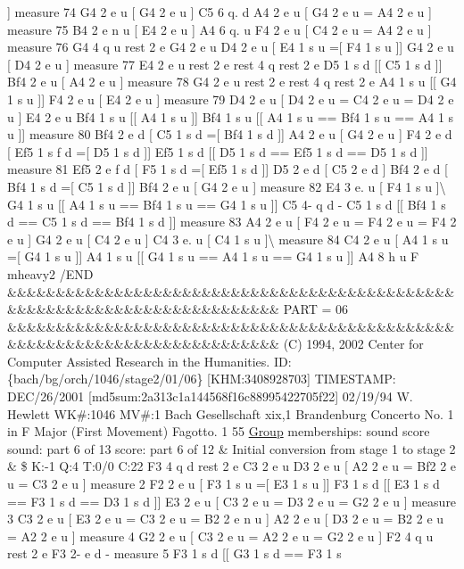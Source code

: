 \mbox{]} measure 74 G4 2 e u \mbox{[} G4 2 e u \mbox{]} C5 6 q. d A4 2 e u \mbox{[} G4 2 e u = A4 2 e u \mbox{]} measure 75 B4 2 e n u \mbox{[} E4 2 e u \mbox{]} A4 6 q. u F4 2 e u \mbox{[} C4 2 e u = A4 2 e u \mbox{]} measure 76 G4 4 q u rest 2 e G4 2 e u D4 2 e u \mbox{[} E4 1 s u =\mbox{[} F4 1 s u \mbox{]}\mbox{]} G4 2 e u \mbox{[} D4 2 e u \mbox{]} measure 77 E4 2 e u rest 2 e rest 4 q rest 2 e D5 1 s d \mbox{[}\mbox{[} C5 1 s d \mbox{]}\mbox{]} Bf4 2 e u \mbox{[} A4 2 e u \mbox{]} measure 78 G4 2 e u rest 2 e rest 4 q rest 2 e A4 1 s u \mbox{[}\mbox{[} G4 1 s u \mbox{]}\mbox{]} F4 2 e u \mbox{[} E4 2 e u \mbox{]} measure 79 D4 2 e u \mbox{[} D4 2 e u = C4 2 e u = D4 2 e u \mbox{]} E4 2 e u Bf4 1 s u \mbox{[}\mbox{[} A4 1 s u \mbox{]}\mbox{]} Bf4 1 s u \mbox{[}\mbox{[} A4 1 s u == Bf4 1 s u == A4 1 s u \mbox{]}\mbox{]} measure 80 Bf4 2 e d \mbox{[} C5 1 s d =\mbox{[} Bf4 1 s d \mbox{]}\mbox{]} A4 2 e u \mbox{[} G4 2 e u \mbox{]} F4 2 e d \mbox{[} Ef5 1 s f d =\mbox{[} D5 1 s d \mbox{]}\mbox{]} Ef5 1 s d \mbox{[}\mbox{[} D5 1 s d == Ef5 1 s d == D5 1 s d \mbox{]}\mbox{]} measure 81 Ef5 2 e f d \mbox{[} F5 1 s d =\mbox{[} Ef5 1 s d \mbox{]}\mbox{]} D5 2 e d \mbox{[} C5 2 e d \mbox{]} Bf4 2 e d \mbox{[} Bf4 1 s d =\mbox{[} C5 1 s d \mbox{]}\mbox{]} Bf4 2 e u \mbox{[} G4 2 e u \mbox{]} measure 82 E4 3 e. u \mbox{[} F4 1 s u \mbox{]}\textbackslash{} G4 1 s u \mbox{[}\mbox{[} A4 1 s u == Bf4 1 s u == G4 1 s u \mbox{]}\mbox{]} C5 4-\/ q d -\/ C5 1 s d \mbox{[}\mbox{[} Bf4 1 s d == C5 1 s d == Bf4 1 s d \mbox{]}\mbox{]} measure 83 A4 2 e u \mbox{[} F4 2 e u = F4 2 e u = F4 2 e u \mbox{]} G4 2 e u \mbox{[} C4 2 e u \mbox{]} C4 3 e. u \mbox{[} C4 1 s u \mbox{]}\textbackslash{} measure 84 C4 2 e u \mbox{[} A4 1 s u =\mbox{[} G4 1 s u \mbox{]}\mbox{]} A4 1 s u \mbox{[}\mbox{[} G4 1 s u == A4 1 s u == G4 1 s u \mbox{]}\mbox{]} A4 8 h u F mheavy2 /\+E\+ND \&\&\&\&\&\&\&\&\&\&\&\&\&\&\&\&\&\&\&\&\&\&\&\&\&\&\&\&\&\&\&\&\&\&\&\&\&\&\&\&\&\&\&\&\&\&\&\&\&\&\&\&\&\&\&\&\&\&\&\&\&\&\&\&\&\&\&\&\&\&\&\&\&\& P\+A\+RT = 06 \&\&\&\&\&\&\&\&\&\&\&\&\&\&\&\&\&\&\&\&\&\&\&\&\&\&\&\&\&\&\&\&\&\&\&\&\&\&\&\&\&\&\&\&\&\&\&\&\&\&\&\&\&\&\&\&\&\&\&\&\&\&\&\&\&\&\&\&\&\&\&\&\&\& (C) 1994, 2002 Center for Computer Assisted Research in the Humanities. ID\+: \{bach/bg/orch/1046/stage2/01/06\} \mbox{[}K\+HM\+:3408928703\mbox{]} T\+I\+M\+E\+S\+T\+A\+MP\+: D\+E\+C/26/2001 \mbox{[}md5sum\+:2a313c1a144568f16c88995422705f22\mbox{]} 02/19/94 W. Hewlett WK\#\+:1046 MV\#\+:1 Bach Gesellschaft xix,1 Brandenburg Concerto No. 1 in F Major (First Movement) Fagotto. 1 55 \hyperlink{class_group}{Group} memberships\+: sound score sound\+: part 6 of 13 score\+: part 6 of 12 \& Initial conversion from stage 1 to stage 2 \& \$ K\+:-\/1 Q\+:4 T\+:0/0 C\+:22 F3 4 q d rest 2 e C3 2 e u D3 2 e u \mbox{[} A2 2 e u = Bf2 2 e u = C3 2 e u \mbox{]} measure 2 F2 2 e u \mbox{[} F3 1 s u =\mbox{[} E3 1 s u \mbox{]}\mbox{]} F3 1 s d \mbox{[}\mbox{[} E3 1 s d == F3 1 s d == D3 1 s d \mbox{]}\mbox{]} E3 2 e u \mbox{[} C3 2 e u = D3 2 e u = G2 2 e u \mbox{]} measure 3 C3 2 e u \mbox{[} E3 2 e u = C3 2 e u = B2 2 e n u \mbox{]} A2 2 e u \mbox{[} D3 2 e u = B2 2 e u = A2 2 e u \mbox{]} measure 4 G2 2 e u \mbox{[} C3 2 e u = A2 2 e u = G2 2 e u \mbox{]} F2 4 q u rest 2 e F3 2-\/ e d -\/ measure 5 F3 1 s d \mbox{[}\mbox{[} G3 1 s d == F3 1 s 